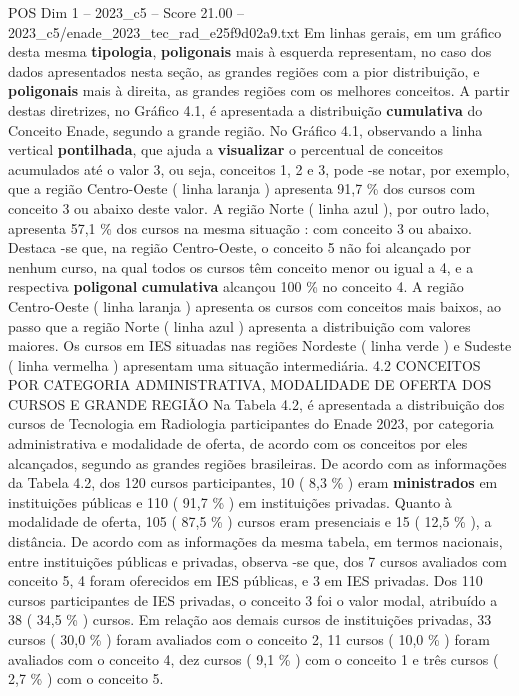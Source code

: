 \begin{textsample}{POS Dim 1 – 2023\_c5 – Score 21.00 – 2023\_c5/enade\_2023\_tec\_rad\_e25f9d02a9.txt}
Em linhas gerais, em um gráfico desta mesma \textbf{tipologia}, \textbf{poligonais} mais à esquerda representam, no caso dos dados apresentados nesta seção, as grandes regiões com a pior distribuição, e \textbf{poligonais} mais à direita, as grandes regiões com os melhores conceitos.
A partir destas diretrizes, no Gráfico 4.1, é apresentada a distribuição \textbf{cumulativa} do Conceito Enade, segundo a grande região.
No Gráfico 4.1, observando a linha vertical \textbf{pontilhada}, que ajuda a \textbf{visualizar} o percentual de conceitos acumulados até o valor 3, ou seja, conceitos 1, 2 e 3, pode -se notar, por exemplo, que a região Centro-Oeste ( linha laranja ) apresenta 91,7 \% dos cursos com conceito 3 ou abaixo deste valor.
A região Norte ( linha azul ), por outro lado, apresenta 57,1 \% dos cursos na mesma situação : com conceito 3 ou abaixo.
Destaca -se que, na região Centro-Oeste, o conceito 5 não foi alcançado por nenhum curso, na qual todos os cursos têm conceito menor ou igual a 4, e a respectiva \textbf{poligonal} \textbf{cumulativa} alcançou 100 \% no conceito 4.
A região Centro-Oeste ( linha laranja ) apresenta os cursos com conceitos mais baixos, ao passo que a região Norte ( linha azul ) apresenta a distribuição com valores maiores.
Os cursos em IES situadas nas regiões Nordeste ( linha verde ) e Sudeste ( linha vermelha ) apresentam uma situação intermediária. 4.2 CONCEITOS POR CATEGORIA ADMINISTRATIVA, MODALIDADE DE OFERTA DOS CURSOS E GRANDE REGIÃO Na Tabela 4.2, é apresentada a distribuição dos cursos de Tecnologia em Radiologia participantes do Enade 2023, por categoria administrativa e modalidade de oferta, de acordo com os conceitos por eles alcançados, segundo as grandes regiões brasileiras.
De acordo com as informações da Tabela 4.2, dos 120 cursos participantes, 10 ( 8,3 \% ) eram \textbf{ministrados} em instituições públicas e 110 ( 91,7 \% ) em instituições privadas.
Quanto à modalidade de oferta, 105 ( 87,5 \% ) cursos eram presenciais e 15 ( 12,5 \% ), a distância.
De acordo com as informações da mesma tabela, em termos nacionais, entre instituições públicas e privadas, observa -se que, dos 7 cursos avaliados com conceito 5, 4 foram oferecidos em IES públicas, e 3 em IES privadas.
Dos 110 cursos participantes de IES privadas, o conceito 3 foi o valor modal, atribuído a 38 ( 34,5 \% ) cursos.
Em relação aos demais cursos de instituições privadas, 33 cursos ( 30,0 \% ) foram avaliados com o conceito 2, 11 cursos ( 10,0 \% ) foram avaliados com o conceito 4, dez cursos ( 9,1 \% ) com o conceito 1 e três cursos ( 2,7 \% ) com o conceito 5.

\end{textsample}
